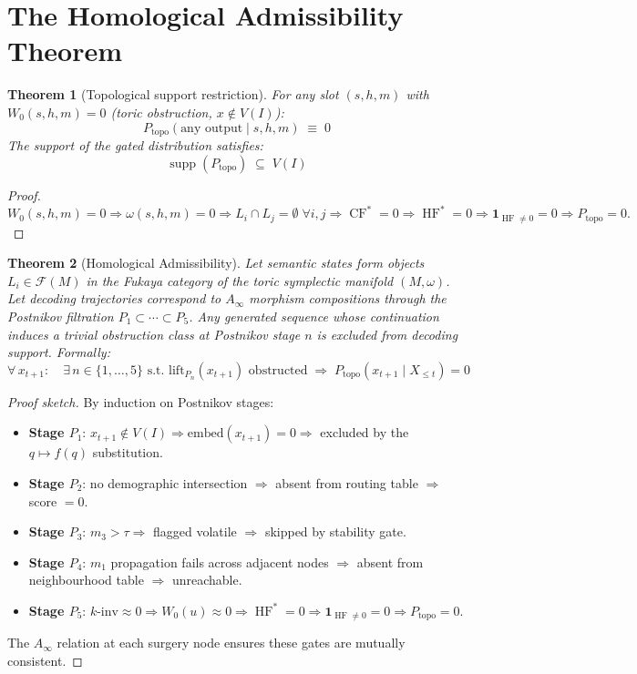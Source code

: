\documentclass[11pt,a4paper]{article}
\newtheorem{theorem}{Theorem}[section]
\DeclareMathOperator{\HF}{HF}
\DeclareMathOperator{\CF}{CF}
\DeclareMathOperator{\supp}{supp}
\newcommand{\one}{\mathbf{1}}
\newcommand{\Fuk}{\mathcal{F}}
\begin{document}
\section{The Homological Admissibility Theorem}

\begin{theorem}[Topological support restriction]
\label{thm:support}
For any slot $(s,h,m)$ with $W_0(s,h,m) = 0$
(toric obstruction, $x \notin V(I)$):
\[
  P_{\mathrm{topo}}(\text{any output} \mid s,h,m) \;\equiv\; 0
\]
The support of the gated distribution satisfies:
\[
  \supp(P_{\mathrm{topo}}) \;\subseteq\; V(I)
\]
\end{theorem}

\begin{proof}
$W_0(s,h,m) = 0
\Rightarrow \omega(s,h,m) = 0
\Rightarrow L_i \cap L_j = \emptyset\;\forall i,j
\Rightarrow \CF^* = 0
\Rightarrow \HF^* = 0
\Rightarrow \one_{\HF \neq 0} = 0
\Rightarrow P_{\mathrm{topo}} = 0.$
\end{proof}

\begin{theorem}[Homological Admissibility]
\label{thm:main}
Let semantic states form objects $L_i \in \Fuk(M)$ in the
Fukaya category of the toric symplectic manifold $(M,\omega)$.
Let decoding trajectories correspond to $A_\infty$ morphism
compositions through the Postnikov filtration
$P_1 \subset \cdots \subset P_5$.
Any generated sequence whose continuation induces a trivial
obstruction class at Postnikov stage $n$ is excluded from
decoding support. Formally:
\[
  \forall\, x_{t+1}:\quad
  \exists\, n \in \{1,\ldots,5\} \text{ s.t. }
  \text{lift}_{P_n}(x_{t+1}) \text{ obstructed}
  \;\Longrightarrow\;
  P_{\mathrm{topo}}(x_{t+1} \mid X_{\leq t}) = 0
\]
\end{theorem}

\begin{proof}[Proof sketch]
By induction on Postnikov stages:
\begin{itemize}
  \item \textbf{Stage $P_1$}: $x_{t+1} \notin V(I)
    \Rightarrow \mathrm{embed}(x_{t+1}) = 0
    \Rightarrow$ excluded by the $q \mapsto f(q)$ substitution.
  \item \textbf{Stage $P_2$}: no demographic intersection
    $\Rightarrow$ absent from routing table $\Rightarrow$ score $= 0$.
  \item \textbf{Stage $P_3$}: $m_3 > \tau \Rightarrow$ flagged volatile
    $\Rightarrow$ skipped by stability gate.
  \item \textbf{Stage $P_4$}: $m_1$ propagation fails across adjacent
    nodes $\Rightarrow$ absent from neighbourhood table $\Rightarrow$
    unreachable.
  \item \textbf{Stage $P_5$}: $k\text{-inv} \approx 0
    \Rightarrow W_0(u) \approx 0
    \Rightarrow \HF^* = 0
    \Rightarrow \one_{\HF \neq 0} = 0
    \Rightarrow P_{\mathrm{topo}} = 0$.
\end{itemize}
The $A_\infty$ relation at each surgery node ensures these gates
are mutually consistent.
\end{proof}
\end{document}

